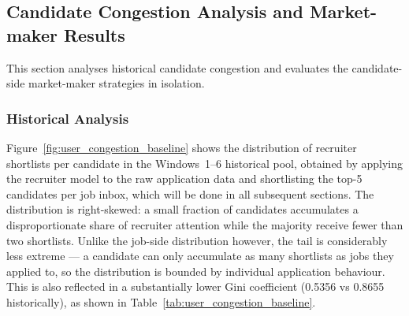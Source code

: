 \subsection{Candidate Congestion Analysis and Market-maker Results}
This section analyses historical candidate congestion and evaluates the candidate-side market-maker strategies in isolation.
\label{sec:exp_user_congestion}
\subsubsection{Historical Analysis}
Figure~\ref{fig:user_congestion_baseline} shows the distribution of recruiter shortlists per candidate in the Windows~1--6 historical pool,
obtained by applying the recruiter model to the raw application data and
shortlisting the top-5 candidates per job inbox, which will be done in all subsequent sections. The
distribution is right-skewed: a small fraction of candidates accumulates a
disproportionate share of recruiter attention while the majority receive
fewer than two shortlists. Unlike the job-side distribution however, the
tail is considerably less extreme --- a candidate can only accumulate as many
shortlists as jobs they applied to, so the distribution is bounded by individual application behaviour. This is also reflected in a substantially lower
Gini coefficient (0.5356 vs 0.8655 historically), as shown in
Table~\ref{tab:user_congestion_baseline}.

